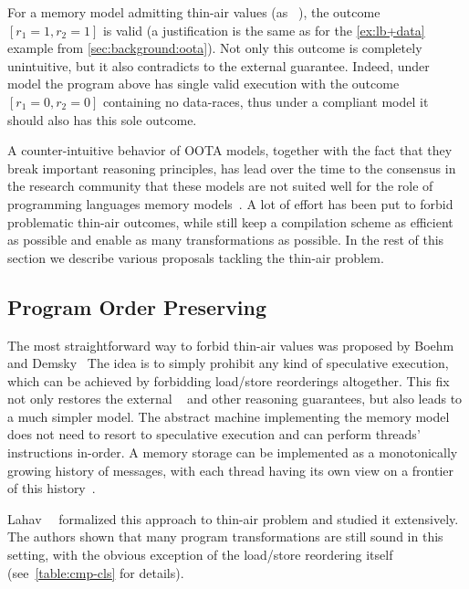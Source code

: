For a memory model admitting thin-air values 
(as \eg \CMM~\cite{Batty-al:POPL11}), 
the outcome ${[r_1=1, r_2=1]}$ is valid
(a justification is the same as for 
the \ref{ex:lb+data} example from \cref{sec:background:oota}).
Not only this outcome is completely unintuitive,
but it also contradicts to the external \DRF guarantee.
Indeed, under \SC model the program above has 
single valid execution with the outcome $[r_1=0, r_2=0]$ 
containing no data-races, thus under a \DRF compliant model 
it should also has this sole outcome.  

A counter-intuitive behavior of OOTA models, 
together with the fact that they break 
important reasoning principles,
has lead over the time to the consensus 
in the research community that these models 
are not suited well for the role of 
programming languages memory models~\cite{Boehm-Demsky:MSPC14, Batty-al:ESOP15}.
A lot of effort has been put to forbid problematic 
thin-air outcomes, while still keep a 
compilation scheme as efficient as possible
and enable as many transformations as possible.
In the rest of this section we describe various proposals 
tackling the thin-air problem. 

\subsection{Program Order Preserving}
\label{sec:analysis:porf}

The most straightforward way to forbid thin-air values 
was proposed by Boehm and Demsky~\cite{Boehm-Demsky:MSPC14}
The idea is to simply prohibit any kind of speculative execution, 
which can be achieved by forbidding load/store reorderings altogether. 
This fix not only restores the external \DRF~\cite{Lahav-al:PLDI17}
and other reasoning guarantees, but also leads to 
a much simpler model. The abstract machine implementing 
the memory model does not need to resort to speculative execution 
and can perform threads' instructions in-order. 
A memory storage can be implemented as a 
monotonically growing history of messages, 
with each thread having its own view on 
a frontier of this history~\cite{Dolan-al:PLDI18, Doherty-al:PPoPP19}.

Lahav~\etal~\cite{Lahav-al:PLDI17} formalized this approach
to thin-air problem and studied it extensively. 
The authors shown that many program transformations 
are still sound in this setting, 
with the obvious exception of the load/store reordering itself
(see~\cref{table:cmp-cls} for details).

